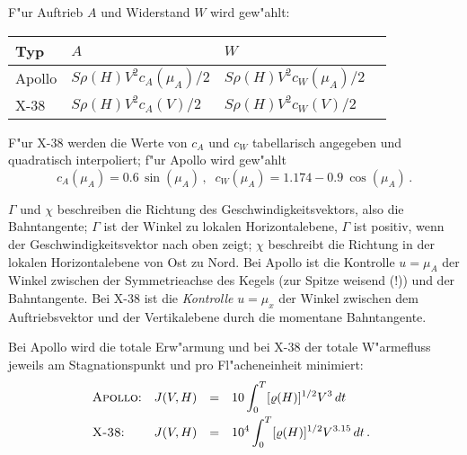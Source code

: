 \documentclass[12pt,a4paper,twoside,leqno]{article}
\begin{document}
F"ur Auftrieb $A$ und Widerstand $W$ wird gew"ahlt:
\bc
\par\vspace{-2ex}
\begin{tabular}{|l|l|l|l|}\hline
Typ & $A$ &  $W$ \\ \hline \hline
{\sc Apollo} &
$ S\rho(H)V^2c_A(\mu_A)/2$ &
$ S\rho(H)V^2c_W(\mu_A)/2$\\ \hline
{\sc X-38} &
$ S \rho(H)V^2c_A(V)/2$ &
$ S\rho(H)V^2c_W(V)/2$ \\ \hline
\end{tabular}
\ec
F"ur {\sc X-38} werden die Werte von $c_A$ und $c_W$ tabellarisch angegeben
und quadratisch interpoliert; f"ur {\sc Apollo} wird gew"ahlt
\[
c_A(\mu_A) = 0.6\, \sin(\mu_A)\,,\;\; c_W(\mu_A) = 1.174 - 0.9\ \cos (\mu_A)\,.
\]
\par
$\Gamma$ und $\chi$ beschreiben die Richtung des Geschwindigkeitsvektors,
also die Bahntangente; $\Gamma$ ist der Winkel zu lokalen Horizontalebene,
$\Gamma$ ist positiv, wenn der Geschwindigkeitsvektor nach oben zeigt;
$\chi$ beschreibt die Richtung in der lokalen Horizontalebene von Ost
zu Nord. Bei {\sc Apollo} ist die Kontrolle $u = \mu_A$ der Winkel zwischen
der Symmetrieachse des Kegels (zur Spitze weisend (!)) und der Bahntangente.
Bei {\sc X-38} ist die {\em Kontrolle} $u = \mu_x$ der Winkel zwischen dem
Auftriebsvektor und der Vertikalebene durch die momentane Bahntangente.
\par
Bei {\sc Apollo} wird die totale Erw"armung und bei {\sc X-38}
der totale W"armefluss jeweils am Stagnationspunkt und pro Fl"acheneinheit
minimiert:
\[
\ba{.}{llll}
\text{{\sc Apollo}:} & J(V,H) &=& \dis 10 \int_0^T [\rho(H)]^{1/2}V^3\, dt\\[2ex]
\text{{\sc X-38}:}  & J(V,H) &=& \dis  10^4 \int_0^T [\rho(H)]^{1/2}V^{3.15}\, dt\,.
\ea{.}
\]
\end{document}

